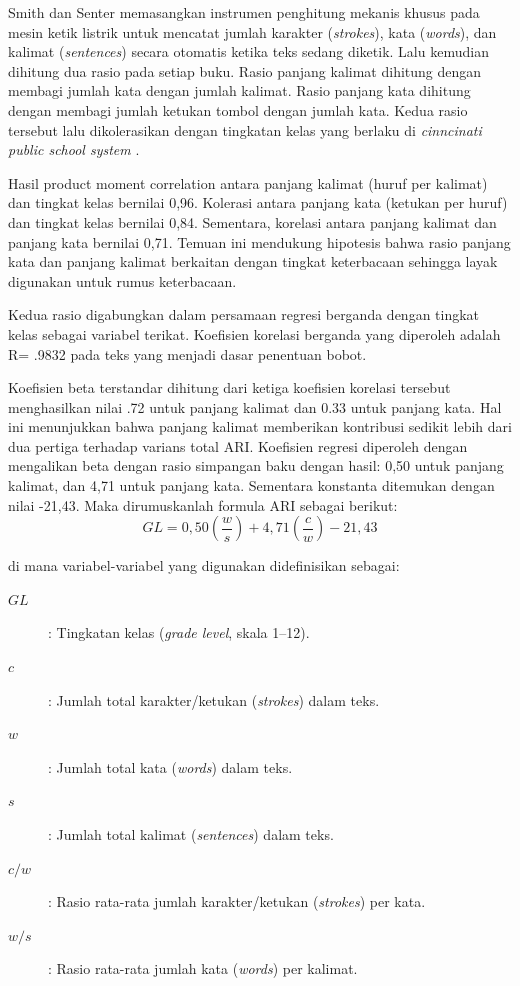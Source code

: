 Smith dan Senter memasangkan instrumen penghitung mekanis khusus pada mesin ketik listrik untuk mencatat jumlah karakter (\textit{strokes}), kata (\textit{words}), dan kalimat (\textit{sentences}) secara otomatis ketika teks sedang diketik.  Lalu kemudian dihitung dua rasio pada setiap buku. Rasio panjang kalimat dihitung dengan membagi jumlah kata dengan jumlah kalimat. Rasio panjang kata dihitung dengan membagi jumlah ketukan tombol dengan jumlah kata. Kedua rasio tersebut lalu dikolerasikan dengan tingkatan kelas yang berlaku di \textit{ cinncinati public school system }. 

Hasil product moment correlation antara panjang kalimat (huruf per kalimat) dan tingkat kelas bernilai  0,96. Kolerasi antara panjang kata (ketukan per huruf) dan tingkat kelas bernilai 0,84. Sementara, korelasi antara panjang kalimat dan panjang kata bernilai 0,71. Temuan ini mendukung hipotesis bahwa rasio panjang kata dan panjang kalimat berkaitan dengan tingkat keterbacaan sehingga layak digunakan untuk rumus keterbacaan.  

Kedua rasio digabungkan dalam persamaan regresi berganda dengan tingkat kelas sebagai variabel terikat. Koefisien korelasi berganda yang diperoleh adalah R= .9832 pada teks yang menjadi dasar penentuan bobot. 

Koefisien beta terstandar dihitung dari ketiga koefisien korelasi tersebut menghasilkan nilai .72 untuk panjang kalimat dan 0.33 untuk panjang kata. Hal ini menunjukkan bahwa panjang kalimat memberikan kontribusi sedikit lebih dari dua pertiga terhadap varians total ARI. Koefisien regresi diperoleh dengan mengalikan beta dengan rasio simpangan baku dengan hasil: 0,50 untuk panjang kalimat, dan 4,71 untuk panjang kata. Sementara konstanta ditemukan dengan nilai -21,43. Maka dirumuskanlah formula ARI sebagai berikut:
\begin{equation}
GL = 0{,}50\left(\frac{w}{s}\right)
   + 4{,}71\left(\frac{c}{w}\right)
   - 21{,}43
\end{equation}

\noindent di mana variabel-variabel yang digunakan didefinisikan sebagai:
\begin{description}
    \item[$GL$] : Tingkatan kelas (\textit{grade level}, skala 1--12).
    \item[$c$]  : Jumlah total karakter/ketukan (\textit{strokes}) dalam teks.
    \item[$w$]  : Jumlah total kata (\textit{words}) dalam teks.
    \item[$s$]  : Jumlah total kalimat (\textit{sentences}) dalam teks.
    \item[$c/w$]: Rasio rata-rata jumlah karakter/ketukan (\textit{strokes}) per kata.
    \item[$w/s$]: Rasio rata-rata jumlah kata (\textit{words}) per kalimat.
\end{description}




